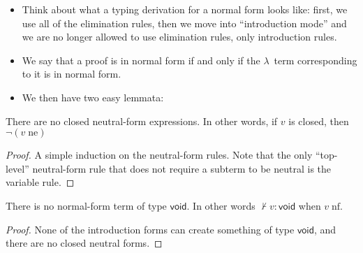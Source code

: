 \documentclass{lecturenotes}
\newcommand{\abs}[2]{\ensuremath{\lambda #1.\,#2}}
\newcommand{\unit}{\ensuremath{\textsf{(}\mkern0.5mu\textsf{)}}}
\newcommand{\pair}[2]{\ensuremath{(#1, #2)}}
\newcommand{\projl}[1]{\ensuremath{\pi_1\mkern2mu#1}}
\newcommand{\projr}[1]{\ensuremath{\pi_2\mkern3mu#1}}
\newcommand{\injl}[1]{\ensuremath{\textsf{inj}_1\mkern2mu#1}}
\newcommand{\injr}[1]{\ensuremath{\textsf{inj}_2\mkern3mu#1}}
\newcommand{\case}[5]{\ensuremath{\textsf{case}\mkern5mu#1\mkern5mu\textsf{of}\mkern5mu\injl{#2} \Rightarrow #3;\mkern5mu\injr{#4} \Rightarrow #5\mkern5mu\textsf{end}}}
\newcommand{\vtype}{\textsf{void}\xspace}
\newcommand{\vcase}[1]{\ensuremath{\textsf{case}\mkern5mu#1\mkern5mu\textsf{of}\mkern5mu\textsf{end}}}
\newcommand{\neutral}[1]{#1\;\text{ne}}
\newcommand{\nf}[1]{#1\;\text{nf}}
\begin{document}

\begin{itemize}
\item Think about what a typing derivation for a normal form looks like: first, we use all of the elimination rules, then we move into ``introduction mode'' and we are no longer allowed to use elimination rules, only introduction rules.
\item We say that a proof is in normal form if and only if the $\lambda$~term corresponding to it is in normal form.
\item We then have two easy lemmata:
\end{itemize}

\begin{lem}
  There are no closed neutral-form expressions.
  In other words, if $v$ is closed, then $\lnot (\neutral{v})$ 
\end{lem}
\begin{proof}
  A simple induction on the neutral-form rules.
  Note that the only ``top-level'' neutral-form rule that does not require a subterm to be neutral is the variable rule.
\end{proof}

\begin{lem}
  There is no normal-form term of type $\vtype$.
  In other words $\not\vdash v : \vtype$ when $\nf{v}$.
\end{lem}
\begin{proof}
  None of the introduction forms can create something of type $\vtype$, and there are no closed neutral forms.
\end{proof}
\end{document}
